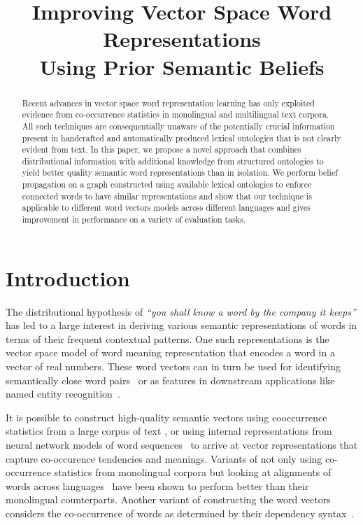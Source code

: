 \documentclass[11pt]{article}
\title{Improving Vector Space Word Representations\\
Using Prior Semantic Beliefs}
\begin{document}
\maketitle
\begin{abstract}
  Recent advances in vector space word representation learning has
  only exploited evidence from co-occurrence statistics in
  monolingual and multilingual text corpora. All such techniques are 
  consequentially unaware of the
  potentially crucial information present in handcrafted and automatically
  produced lexical ontologies that is not clearly evident from text. In this 
  paper, we propose a novel approach that combines distributional 
  information with additional knowledge from structured ontologies to 
  yield better quality semantic word representations
  than in isolation. We perform belief propagation on a graph constructed
  using available lexical ontologies to enforce connected words to
  have similar representations and show that our technique is applicable to
  different word vectors models across different languages and gives improvement
  in performance on a variety of evaluation tasks.
\end{abstract}

\section{Introduction}

The distributional hypothesis of  \emph{``you shall know a word by the
company it keeps''} has led to a large interest in deriving various semantic representations
of words in terms of their frequent contextual patterns. One such representations is the vector
space model of word meaning representation that encodes a word in a vector of real numbers.
These word vectors can in turn be used for identifying semantically close word 
pairs~\cite{Turney:2006:SSR:1174520.1174523,Agirre:2009:SSR:1620754.1620758} or as features
in downstream applications like named entity recognition~\cite{turian:2010}.

It is possible to construct high-quality semantic vectors using cooccurrence 
statistics from a large corpus of text 
\cite{deerwester-90}, or using internal representations from neural 
network models of word sequences~\cite{Collobert:2008:UAN:1390156.1390177} to 
arrive at vector representations that capture co-occurence tendencies and meanings.
Variants of not only using co-occurrence statistics from monolingual corpora but looking
at alignments of words across languages~\cite{zou-EtAl:2013:EMNLP,hermann2014multilingual,faruqui-dyer:2014:EACL2014}
have been shown to perform better than their monolingual counterparts. Another variant of
constructing the word vectors considers the co-occurrence of words as determined by their
dependency syntax~\cite{Pado:2007:DCS:1268656.1268658}. 
\end{document}

